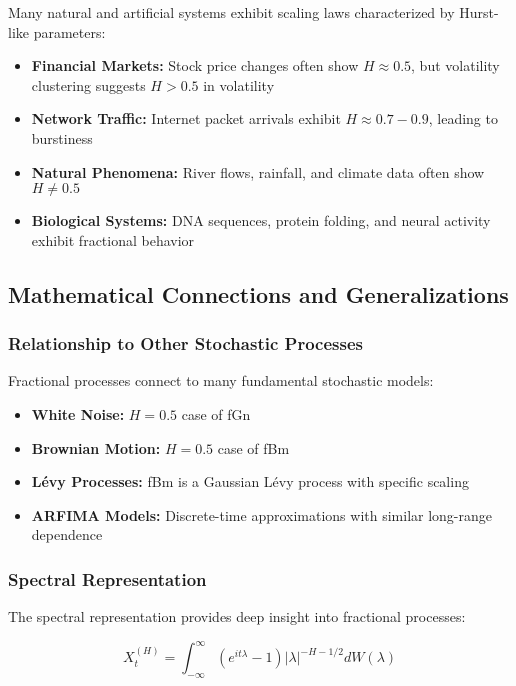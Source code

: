 \documentclass[11pt,a4paper]{article}
\begin{document}
Many natural and artificial systems exhibit scaling laws characterized by Hurst-like parameters:

\begin{itemize}
    \item \textbf{Financial Markets:} Stock price changes often show $H \approx 0.5$, but volatility clustering suggests $H > 0.5$ in volatility
    \item \textbf{Network Traffic:} Internet packet arrivals exhibit $H \approx 0.7-0.9$, leading to burstiness
    \item \textbf{Natural Phenomena:} River flows, rainfall, and climate data often show $H \neq 0.5$
    \item \textbf{Biological Systems:} DNA sequences, protein folding, and neural activity exhibit fractional behavior
\end{itemize}

\subsection{Mathematical Connections and Generalizations}

\subsubsection{Relationship to Other Stochastic Processes}

Fractional processes connect to many fundamental stochastic models:

\begin{itemize}
    \item \textbf{White Noise:} $H = 0.5$ case of fGn
    \item \textbf{Brownian Motion:} $H = 0.5$ case of fBm  
    \item \textbf{Lévy Processes:} fBm is a Gaussian Lévy process with specific scaling
    \item \textbf{ARFIMA Models:} Discrete-time approximations with similar long-range dependence
\end{itemize}

\subsubsection{Spectral Representation}

The spectral representation provides deep insight into fractional processes:

\begin{equation}
X_t^{(H)} = \int_{-\infty}^{\infty} \left( e^{it\lambda} - 1 \right) |\lambda|^{-H-1/2} dW(\lambda)
\end{equation}
\end{document}
